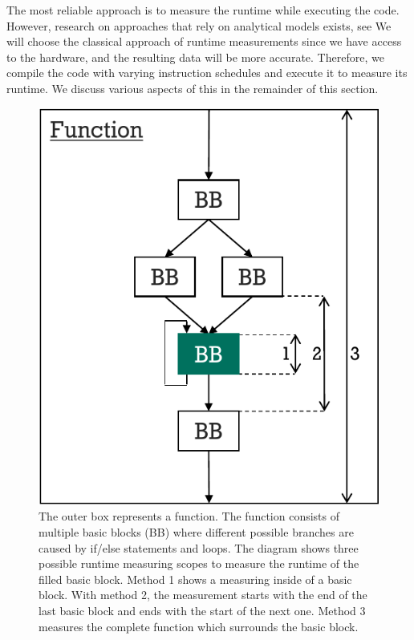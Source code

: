 The most reliable approach is to measure the runtime while executing the code.
However, research on approaches that rely on analytical models exists, see  %
We will choose the classical approach of runtime measurements since we have access to the hardware, and the resulting data will be more accurate.
Therefore, we compile the code with varying instruction schedules and execute it to measure its runtime.
We discuss various aspects of this in the remainder of this section.

\begin{figure}
    \centering
    \includegraphics[scale=0.8]{img/ppt/runtime_measurement_scopes-crop.pdf}
    \caption[Possibile scopes for measuring runtimes]{The outer box represents a function. 
    The function consists of multiple basic blocks (BB) where different possible branches are caused by if/else statements and loops. 
    The diagram shows three possible runtime measuring scopes to measure the runtime of the filled basic block.
    Method 1 shows a measuring inside of a basic block. 
    With method 2, the measurement starts with the end of the last basic block and ends with the start of the next one.
    Method 3 measures the complete function which surrounds the basic block.}
    \label{fig:approach:runtime_scopes}
\end{figure}

